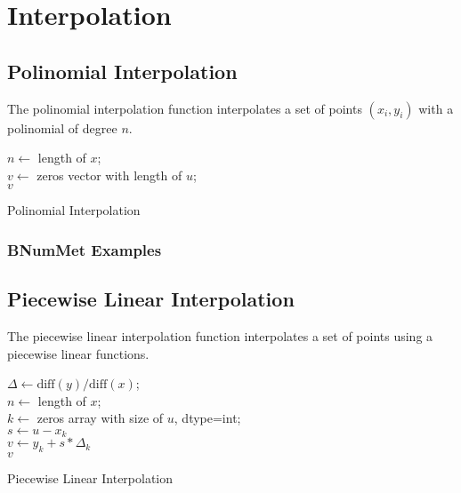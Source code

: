 
\section*{Interpolation}
\subsection*{Polinomial Interpolation}
The polinomial interpolation function interpolates a set of points $(x_i, y_i)$ with a polinomial of degree $n$. 

\begin{algorithm}[H]
\label{alg:Polinomial Interpolation}
\SetAlgoLined
\DontPrintSemicolon
{}
$n \gets$ length of $x$;\\
$v \gets$ zeros vector with length of $u$;\\
\Return $v$
\caption{Polinomial Interpolation}

\end{algorithm}
\subsubsection*{BNumMet Examples}

\subsection*{Piecewise Linear Interpolation}
The piecewise linear interpolation function interpolates a set of points using a piecewise linear functions.

\begin{algorithm}[H]
\label{alg:Piecewise Linear Interpolation}
\SetAlgoLined
\DontPrintSemicolon
{}
$\Delta \gets \text{diff}(y) / \text{diff}(x)$;\\
$n \gets$ length of $x$;\\
$k \gets$ zeros array with size of $u$, dtype=int;\\
$s \gets u - x_k$\\
$v \gets y_k + s * \Delta_k$\\
\Return $v$
\caption{Piecewise Linear Interpolation}

\end{algorithm}
